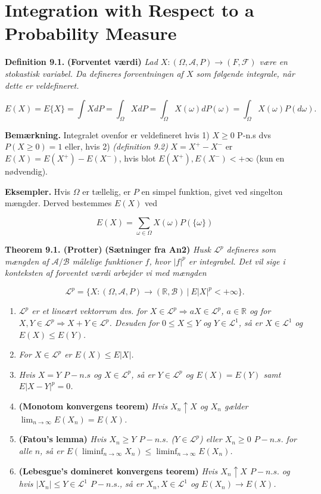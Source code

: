 \documentclass[a4paper,12pt,openany]{book}
\providecommand{\tightlist}{%
 \setlength{\itemsep}{0pt}\setlength{\parskip}{0pt}}
\begin{document}
\hypertarget{integration-with-respect-to-a-probability-measure}{%
\section{Integration with Respect to a Probability Measure}\label{integration-with-respect-to-a-probability-measure}}

\textbf{Definition 9.1.} \textbf{(Forventet værdi)} \emph{Lad \(X : (\Omega, \mathcal{A}, P) \to (F,\mathcal{F})\) være en stokastisk variabel. Da defineres forventningen af \(X\) som følgende integrale, når dette er veldefineret.}

\[
E(X)=E\{X\}=\int X dP=\int_\Omega X dP=\int_\Omega X(\omega)dP(\omega)=\int_\Omega X(\omega)P(d\omega).
\]

\textbf{Bemærkning.} Integralet ovenfor er veldefineret hvis 1) \(X\ge 0\) P-n.s dvs \(P(X\ge 0)=1\) eller, hvis 2) \emph{(definition 9.2)} \(X=X^+-X^-\) er \(E(X)=E(X^+)-E(X^-)\), hvis blot \(E(X^+),E(X^-)<+\infty\) (kun en nødvendig).

\textbf{Eksempler.} Hvis \(\Omega\) er tællelig, er \(P\) en simpel funktion, givet ved singelton mængder. Derved bestemmes \(E(X)\) ved

\[
E(X)=\sum_{\omega\in\Omega} X(\omega)P(\{\omega\})
\]

\textbf{Theorem 9.1. (Protter)} \textbf{(Sætninger fra An2)} \emph{Husk \(\mathcal{L}^p\) defineres som mængden af \(\mathcal{A}/\mathcal{B}\) målelige funktioner \(f\), hvor \(\vert f\vert ^p\) er integrabel. Det vil sige i konteksten af forventet værdi arbejder vi med mængden}

\[
\mathcal{L}^p=\{X : (\Omega,\mathcal{A},P)\to(\mathbb{R},\mathcal{B})\ \vert\ E\vert X\vert^p< +\infty\}.
\]

\begin{enumerate}
\def\labelenumi{\alph{enumi}.}
\tightlist
\item
  \emph{\(\mathcal{L}^p\) er et lineært vektorrum dvs. for \(X\in \mathcal{L}^p\Rightarrow aX\in\mathcal{L}^p\), \(a\in\mathbb{R}\) og for \(X,Y\in\mathcal{L}^p\Rightarrow X+Y\in\mathcal{L}^p\). Desuden for \(0\le X\le Y\) og \(Y\in\mathcal{L}^1\), så er \(X\in\mathcal{L}^1\) og \(E(X)\le E(Y)\).}
\item
  \emph{For \(X\in\mathcal{L}^p\) er \(E(X)\le E\vert X\vert\).}
\item
  \emph{Hvis \(X=Y\) \(P-n.s\) og \(X\in\mathcal{L}^p\), så er \(Y\in\mathcal{L}^p\) og \(E(X)=E(Y)\) samt \(E\vert X-Y\vert^p=0\).}
\item
  \textbf{(Monotom konvergens teorem)} \emph{Hvis \(X_n\uparrow X\) og \(X_n\) gælder \(\lim_{n\to \infty} E(X_n)=E(X)\).}
\item
  \textbf{(Fatou's lemma)} \emph{Hvis \(X_n\ge Y\) \(P-n.s.\) (\(Y\in\mathcal{L}^p\)) eller \(X_n\ge 0\) \(P-n.s.\) for alle \(n\), så er \(E(\liminf_{n\to\infty}X_n)\le \liminf_{n\to \infty} E(X_n)\).}
\item
  \textbf{(Lebesgue's domineret konvergens teorem)} \emph{Hvis \(X_n\uparrow X\) \(P-n.s.\) og hvis \(\vert X_n\vert \le Y\in\mathcal{L}^1\) \(P-n.s.\), så er \(X_n,X\in\mathcal{L}^1\) og \(E(X_n)\to E(X)\).}
\end{enumerate}
\end{document}
